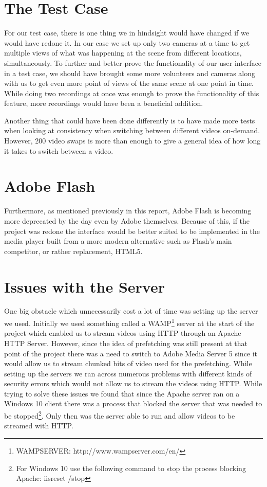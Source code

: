 \section{The Test Case}
\label{sec:test case} 
For our test case, there is one thing we in hindsight would have changed if we would have redone it. In our case we set up only two cameras at a time to get multiple views of what was happening at the scene from different locations, simultaneously. To further and better prove the functionality of our user interface in a test case, we should have brought some more volunteers and cameras along with us to get even more point of views of the same scene at one point in time. While doing two recordings at once was enough to prove the functionality of this feature, more recordings would have been a beneficial addition. 

Another thing that could have been done differently is to have made more tests when looking at consistency when switching between different videos on-demand. However, 200 video swaps is more than enough to give a general idea of how long it takes to switch between a video.

\section{Adobe Flash}
\label{sec:adobe flash}

Furthermore, as mentioned previously in this report, Adobe Flash is becoming more deprecated by the day even by Adobe themselves. Because of this, if the project was redone the interface would be better suited to be implemented in the media player built from a more modern alternative such as Flash's main competitor, or rather replacement, HTML5.

\section{Issues with the Server}
\label{sec:serverissues}

One big obstacle which unnecessarily cost a lot of time was setting up the server we used. Initially we used something called a WAMP\footnote{WAMPSERVER: http://www.wampserver.com/en/} server at the start of the project which enabled us to stream videos using HTTP through an Apache HTTP Server. However, since the idea of prefetching was still present at that point of the project there was a need to switch to Adobe Media Server 5 since it would allow us to stream chunked bits of video used for the prefetching. While setting up the servers we ran across numerous problems with different kinds of security errors which would not allow us to stream the videos using HTTP. While trying to solve these issues we found that since the Apache server ran on a Windows 10 client there was a process that blocked the server that was needed to be stopped\footnote{For Windows 10 use the following command to stop the process blocking Apache: iisreset /stop}. Only then was the server able to run and allow videos to be streamed with HTTP.

